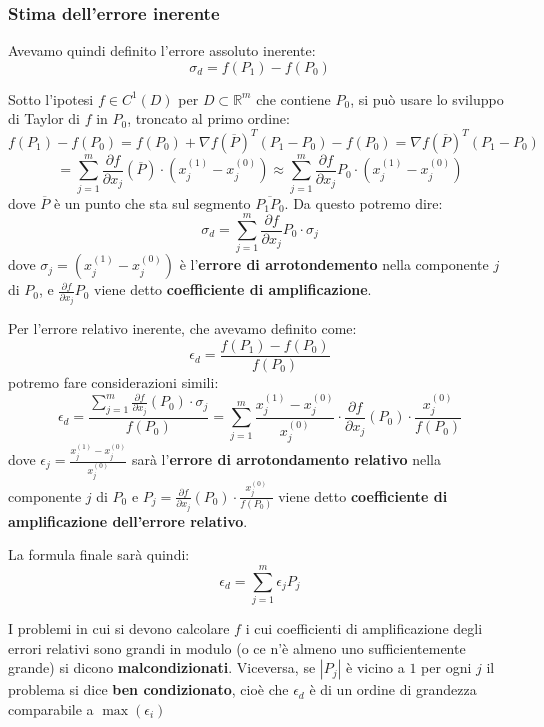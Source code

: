 \documentclass[a4paper,11pt]{article}
\begin{document}
\subsubsection{Stima dell'errore inerente}
Avevamo quindi definito l'errore assoluto inerente:
$$
\sigma_d = f(P_1) - f(P_0)
$$

Sotto l'ipotesi $f \in C^1(D)$ per $D \subset \mathbb{R}^m$ che contiene $P_0$, si può usare  lo sviluppo di Taylor di $f$ in $P_0$, troncato al primo ordine:
$$
f(P_1) - f(P_0) = f(P_0) + \nabla f(\overline{P})^T (P_1 - P_0) - f(P_0) = \nabla f(\overline{P})^T (P_1 - P_0)
$$
$$
= \sum_{j=1}^m \frac{\partial f}{\partial x_j}(\overline{P}) \cdot \left(x_j^{(1)} - x_j^{(0)}\right)
\approx \sum_{j=1}^m \frac{\partial f}{\partial x_j}{P_0} \cdot \left(x_j^{(1)} - x_j^{(0)}\right)
$$
dove $\overline{P}$ è un punto che sta sul segmento $\overline{P_1 P_0}$.
Da questo potremo dire:
$$
\sigma_d = \sum_{j=1}^m \frac{\partial f}{\partial x_j}{P_0} \cdot \sigma_j
$$
dove $\sigma_j = \left(x_j^{(1)} - x_j^{(0)}\right)$ è l'\textbf{errore di arrotondemento} nella componente $j$ di $P_0$, e $\frac{\partial f}{\partial x_j}{P_0}$ viene detto \textbf{coefficiente di amplificazione}.

\par\smallskip

Per l'errore relativo inerente, che avevamo definito come:
$$
\epsilon_d = \frac{f(P_1) - f(P_0)}{f(P_0)}
$$
potremo fare considerazioni simili: 
$$
\epsilon_d = \frac{ \sum_{j=1}^{m} \frac{\partial f}{\partial x_j} (P_0) \cdot \sigma_j }{f(P_0)} = \sum_{j=1}^m \frac{ x_j^{(1)} - x_j^{(0)} }{x_j^{(0)}} \cdot \frac{\partial f}{\partial x_j} (P_0) \cdot \frac{x_j^{(0)}}{f(P_0)}  
$$
dove $\epsilon_j = \frac{ x_j^{(1)} - x_j^{(0)} }{x_j^{(0)}}$ sarà l'\textbf{errore di arrotondamento relativo} nella componente $j$ di $P_0$ e $P_j = \frac{\partial f}{\partial x_j} (P_0) \cdot \frac{x_j^{(0)}}{f(P_0)}$ viene detto \textbf{coefficiente di amplificazione dell'errore relativo}.

La formula finale sarà quindi:
$$
\epsilon_d = \sum_{j=1}^m \epsilon_j P_j
$$

I problemi in cui si devono calcolare $f$ i cui coefficienti di amplificazione degli errori relativi sono grandi in modulo (o ce n'è almeno uno sufficientemente grande) si dicono \textbf{malcondizionati}.
Viceversa, se $|P_j|$ è vicino a $1$ per ogni $j$ il problema si dice \textbf{ben condizionato}, cioè che $\epsilon_d$ è di un ordine di grandezza comparabile a $\max(\epsilon_i)$
\end{document}
